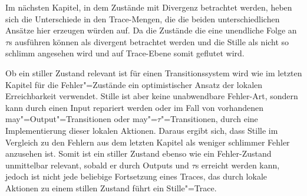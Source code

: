 \begin{figure}[htbp]
  \begin{center}
    \caption{}
    \label{QuiTracesBsp}
  \end{center}
\end{figure}

Im nächsten Kapitel, in dem Zustände mit Divergenz betrachtet werden, heben
sich die Unterschiede in den Trace-Mengen, die die beiden unterschiedlichen
Ansätze hier erzeugen würden auf. Da die Zustände die eine unendliche Folge an
$\tau$s ausführen können als divergent betrachtet werden und die Stille als
nicht so schlimm angesehen wird und auf Trace-Ebene somit geflutet wird.

Ob ein stiller Zustand relevant ist für einen Transitionssystem wird wie im
letzten Kapitel für die Fehler"=Zustände ein optimistischer Ansatz der lokalen
Erreichbarkeit verwendet. Stille ist aber keine unabwendbare \glqq
Fehler-Art\grqq{}, sondern kann durch einen Input repariert werden oder im Fall
von vorhandenen may"=Output"=Transitionen oder may"=$\tau$"=Transitionen, durch
eine Implementierung dieser lokalen Aktionen. Daraus ergibt sich, dass Stille
im Vergleich zu den Fehlern aus dem letzten Kapitel als weniger \glqq schlimmer
Fehler\grqq{} anzusehen ist. Somit ist ein stiller Zustand ebenso wie ein
Fehler-Zustand unmittelbar relevant, sobald er durch Outputs und $\tau$s
erreicht werden kann, jedoch ist nicht jede beliebige Fortsetzung eines Traces,
das durch lokale Aktionen zu einem stillen Zustand führt ein Stille"=Trace.

